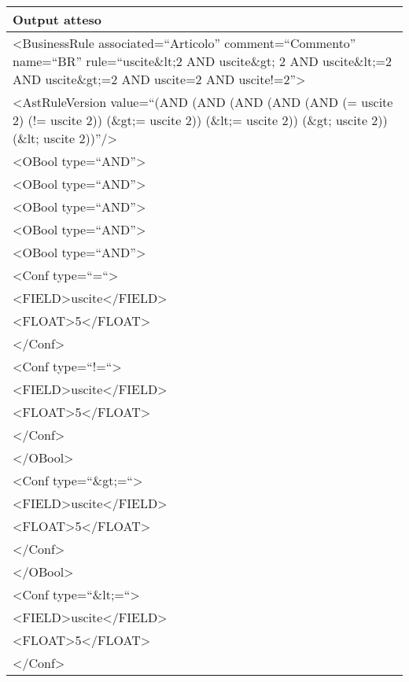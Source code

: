 \begin{center}
\begin{tabular}{|p{11cm}|} \hline
\textbf{Output atteso}\\ \hline
\textless BusinessRule associated=``Articolo'' comment=``Commento'' name=``BR'' rule=``uscite\&lt;2 AND uscite\&gt; 2 AND uscite\&lt;=2 AND uscite\&gt;=2 AND uscite=2 AND uscite!=2''\textgreater\\
 \textless AstRuleVersion value=``(AND (AND (AND (AND (AND (= uscite 2) (!= uscite 2)) (\&gt;= uscite 2)) (\&lt;= uscite 2)) (\&gt; uscite 2)) (\&lt; uscite 2))''/\textgreater \\
\textless OBool type=``AND''\textgreater\\
\textless OBool type=``AND''\textgreater\\
\textless OBool type=``AND''\textgreater\\
\textless OBool type=``AND''\textgreater\\
\textless OBool type=``AND''\textgreater\\
\textless Conf type=``=``\textgreater \\
\textless FIELD\textgreater uscite\textless /FIELD\textgreater\\
 \textless FLOAT\textgreater 5\textless /FLOAT\textgreater\\
 \textless /Conf\textgreater\\
\textless Conf type=``!=``\textgreater \\
\textless FIELD\textgreater uscite\textless /FIELD\textgreater\\
 \textless FLOAT\textgreater 5\textless /FLOAT\textgreater\\
 \textless /Conf\textgreater\\
\textless /OBool\textgreater \\
\textless Conf type=``\&gt;=``\textgreater \\
\textless FIELD\textgreater uscite\textless /FIELD\textgreater\\
 \textless FLOAT\textgreater 5\textless /FLOAT\textgreater\\
 \textless /Conf\textgreater\\
\textless /OBool\textgreater \\
\textless Conf type=``\&lt;=``\textgreater \\
\textless FIELD\textgreater uscite\textless /FIELD\textgreater\\
 \textless FLOAT\textgreater 5\textless /FLOAT\textgreater\\
 \textless /Conf\textgreater\\

\end{tabular}
\end{center}
